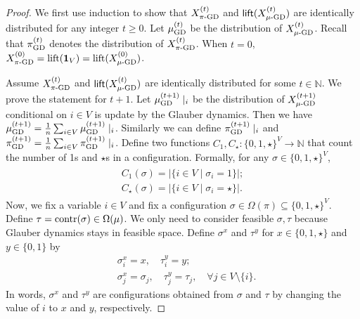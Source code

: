 \documentclass[11pt,a4paper]{article}
\theoremstyle{definition}
\newcommand{\abs}[1]{\left\vert#1\right\vert}
\def\*#1{\mathbf{#1}} %
\begin{document}
\begin{proof}

    We first use induction to show that $X^{(t)}_{\textnormal{$\pi$-GD}}$ and $\textnormal{\textsf{lift}}(X^{(t)}_{\textnormal{$\mu$-GD}})$ are identically distributed for any integer $t\geq 0$.
    Let $\mu^{(t)}_{\textnormal{GD}}$ be the distribution of $X^{(t)}_{\mu\textnormal{-GD}}$.
    Recall that $\pi^{(t)}_{\textnormal{GD}}$ denotes the distribution of $X^{(t)}_{\pi\textnormal{-GD}}$.
    When $t=0$, $X^{(0)}_{\pi\textnormal{-GD}}=\textnormal{lift}(\*1_V)=\textnormal{lift}(X^{(0)}_{\mu\textnormal{-GD}})$.

    Assume $X^{(t)}_{\textnormal{$\pi$-GD}}$ and $\textnormal{\textsf{lift}}(X^{(t)}_{\textnormal{$\mu$-GD}})$ are identically distributed for some $t\in \mathbb{N}$. We prove the statement for $t+1$.
    Let $\mu^{(t+1)}_{\textnormal{GD}}\mid_i$ be the distribution of $X^{(t+1)}_{\textnormal{$\mu$-GD}}$ conditional on $i\in V$ is update by the Glauber dynamics. Then we have $\mu^{(t+1)}_{\textnormal{GD}}=\frac{1}{n}\sum_{i\in V}\mu^{(t+1)}_{\textnormal{GD}}\mid_i$. Similarly we can define $\pi^{(t+1)}_{\textnormal{GD}}\mid_i$ and $\pi^{(t+1)}_{\textnormal{GD}}=\frac{1}{n}\sum_{i\in V}\pi^{(t+1)}_{\textnormal{GD}}\mid_i$. Define two functions $C_1,C_\star:\{0,1,\star\}^V \to \mathbb{N}$ that count the number of 1s and $\star$s in a configuration. Formally, for any $\sigma\in \{0,1,\star\}^V$,
    \begin{align}\label{def:c-sigma}
    \begin{split}
    C_1(\sigma)=\abs{\{i\in V\mid\sigma_i=1 \}};\\
    C_\star(\sigma)=\abs{\{i\in V\mid\sigma_i=\star \}}.   
    \end{split}
    \end{align}
    Now, we fix a variable $i \in V$ and fix a configuration $\sigma\in \Omega(\pi) \subseteq \{0,1,\star\}^V$. Define $\tau=\textnormal{contr}(\sigma) \in \Omega(\mu)$. We only need to consider feasible $\sigma,\tau$ because Glauber dynamics stays in feasible space.
    Define $\sigma^{x}$ and $\tau^y$ for $x\in \{0,1,\star\}$ and $y\in\{0,1\}$ by
    \begin{align*}
    &\sigma^x_i=x,\quad \tau^y_i = y;\\
    &\sigma^x_j = \sigma_j,\quad \tau^y_j=\tau_j,\quad \forall j\in V\setminus \{i\}.
    \end{align*}
    In words, $\sigma^x$ and $\tau^y$ are configurations obtained from $\sigma$ and $\tau$ by changing the value of $i$ to $x$ and $y$, respectively.

\end{proof}
\end{document}
